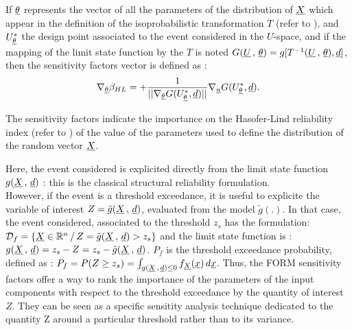 {  If ${\underline{\theta}}$ represents the vector of all the parameters of the distribution of ${\underline{X}}$ which appear in the definition of the isoprobabilistic transformation $T$ (refer to ), and $U_{{\underline{\theta}}}^{*}$ the design point associated to the event considered in the $U$-space, and if the mapping of the limit state function by the $T$ is noted $G({\underline{U}}\,,\,{\underline{\theta}}) =  g[T^{-1}({\underline{U}}\,,\,{\underline{\theta}}), {\underline{d}}]$, then the sensitivity factors vector is defined as :
  \begin{align*}
    \nabla_{{\underline{\theta}}} \beta_{HL} =  \displaystyle +\frac{1}{||\nabla_{{\underline{\theta}}} G(U_{{\underline{\theta}}}^{*}, {\underline{d}})||} \nabla_{{\underline{u}}} G(U_{{\underline{\theta}}}^{*}, {\underline{d}}).
  \end{align*}

  The sensitivity factors indicate the importance on the Hasofer-Lind reliability index (refer to ) of the value of the parameters used to define the distribution of the random vector ${\underline{X}}$.
}
{
  Here, the event considered is explicited directly from the limit state function $g({\underline{X}}\,,\,{\underline{d}})$ : this is the classical structural reliability formulation.\\
  However, if the event is a threshold exceedance, it is useful to explicite the variable of interest $Z=\tilde{g}({\underline{X}}\,,\,{\underline{d}})$, evaluated from the model $\tilde{g}(.)$. In that case, the event considered, associated to the threshold $z_s$ has the formulation: ${\mathcal D}_f = \{ {\underline{X}} \in {\mathbb R}^n \, / \, Z=\tilde{g}({\underline{X}}\,,\,{\underline{d}}) > z_s \}$
  and the limit state function is : $g({\underline{X}}\,,\,{\underline{d}}) = z_s - Z = z_s - \tilde{g}({\underline{X}}\,,\,{\underline{d}})$. $P_f$ is the threshold exceedance probability, defined as : $P_f     =       P(Z \geq z_s) = \int_{g({\underline{X}}\,,\,{\underline{d}}) \le 0}  f_{\underline{X}}(\underline{x})\, d{\underline{x}}$.
  Thus, the FORM sensitivity factors offer a way to rank the importance of the parameters of the input components with respect to the threshold exceedance by the quantity of interest $Z$. They can be seen as a specific sensitity analysis technique dedicated to the quantity Z around a particular threshold rather than to its variance.
}

